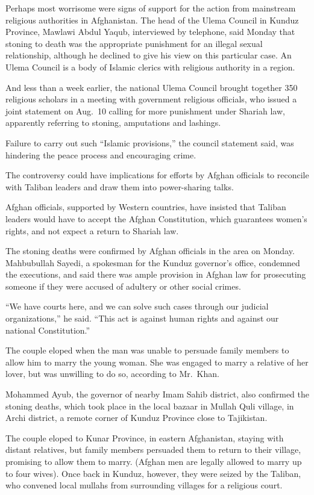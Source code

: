 ﻿\documentclass[12pt]{article}
\begin{document}
Perhaps most worrisome were signs of support for the action from mainstream religious authorities in
Afghanistan. The head of the Ulema Council in Kunduz Province, Mawlawi Abdul Yaqub, interviewed by
telephone, said Monday that stoning to death was the appropriate punishment for an illegal sexual
relationship, although he declined to give his view on this particular case. An Ulema Council is a
body of Islamic clerics with religious authority in a region.

And less than a week earlier, the national Ulema Council brought together 350 religious scholars in
a meeting with government religious officials, who issued a joint statement on Aug.~10 calling for
more punishment under Shariah law, apparently referring to stoning, amputations and lashings.

Failure to carry out such ``Islamic provisions,'' the council statement said, was hindering the
peace process and encouraging crime.

The controversy could have implications for efforts by Afghan officials to reconcile with Taliban
leaders and draw them into power-sharing talks.

Afghan officials, supported by Western countries, have insisted that Taliban leaders would have to
accept the Afghan Constitution, which guarantees women's rights, and not expect a return to Shariah
law.

The stoning deaths were confirmed by Afghan officials in the area on Monday. Mahbubullah Sayedi, a
spokesman for the Kunduz governor's office, condemned the executions, and said there was ample
provision in Afghan law for prosecuting someone if they were accused of adultery or other social
crimes.

``We have courts here, and we can solve such cases through our judicial organizations,'' he said.
``This act is against human rights and against our national Constitution.''

The couple eloped when the man was unable to persuade family members to allow him to marry the young
woman. She was engaged to marry a relative of her lover, but was unwilling to do so, according to
Mr.~Khan.

Mohammed Ayub, the governor of nearby Imam Sahib district, also confirmed the stoning deaths, which
took place in the local bazaar in Mullah Quli village, in Archi district, a remote corner of Kunduz
Province close to Tajikistan.

The couple eloped to Kunar Province, in eastern Afghanistan, staying with distant relatives, but
family members persuaded them to return to their village, promising to allow them to marry. (Afghan
men are legally allowed to marry up to four wives). Once back in Kunduz, however, they were seized
by the Taliban, who convened local mullahs from surrounding villages for a religious court.
\end{document}
